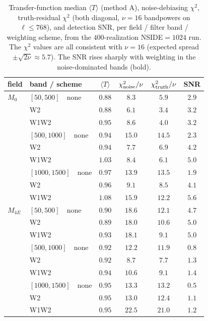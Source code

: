 \documentclass[11pt]{article}
\begin{document}
\begin{table}[h]
\centering
\small
\begin{tabular}{llcccc}
\toprule
field & band / scheme & $\langle T\rangle$ & $\chi^2_{\rm noise}/\nu$ & $\chi^2_{\rm truth}/\nu$ & SNR\\
\midrule
$M_0$  & $[50,500]$\ \ none   & $0.88$ & $8.3$  & $5.9$  & $2.9$\\
       & \hphantom{$[50,500]$\ \ }W2     & $0.88$ & $6.1$  & $3.4$  & $3.2$\\
       & \hphantom{$[50,500]$\ \ }W1W2   & $0.95$ & $8.6$  & $4.0$  & $3.2$\\
       & $[500,1000]$\ \ none & $0.94$ & $15.0$ & $14.5$ & $2.3$\\
       & \hphantom{$[500,1000]$\ \ }W2     & $0.94$ & $7.7$  & $6.9$  & $4.2$\\
       & \hphantom{$[500,1000]$\ \ }W1W2   & $1.03$ & $8.4$  & $6.1$  & $\mathbf{5.0}$\\
       & $[1000,1500]$\ \ none& $0.97$ & $13.9$ & $13.5$ & $1.9$\\
       & \hphantom{$[1000,1500]$\ \ }W2     & $0.96$ & $9.1$  & $8.5$  & $4.1$\\
       & \hphantom{$[1000,1500]$\ \ }W1W2   & $1.08$ & $15.9$ & $12.2$ & $\mathbf{5.6}$\\
\midrule
$M_{4E}$ & $[50,500]$\ \ none   & $0.90$ & $18.6$ & $12.1$ & $4.7$\\
       & \hphantom{$[50,500]$\ \ }W2     & $0.89$ & $18.0$ & $10.6$ & $5.0$\\
       & \hphantom{$[50,500]$\ \ }W1W2   & $0.93$ & $18.1$ & $9.1$  & $5.0$\\
       & $[500,1000]$\ \ none & $0.92$ & $12.2$ & $11.9$ & $0.8$\\
       & \hphantom{$[500,1000]$\ \ }W2     & $0.92$ & $8.7$  & $7.7$  & $1.3$\\
       & \hphantom{$[500,1000]$\ \ }W1W2   & $0.94$ & $10.6$ & $9.1$  & $1.4$\\
       & $[1000,1500]$\ \ none& $0.95$ & $13.3$ & $13.2$ & $0.5$\\
       & \hphantom{$[1000,1500]$\ \ }W2     & $0.95$ & $13.0$ & $12.4$ & $1.1$\\
       & \hphantom{$[1000,1500]$\ \ }W1W2   & $0.95$ & $22.5$ & $21.0$ & $1.2$\\
\bottomrule
\end{tabular}
\caption{Transfer-function median $\langle T\rangle$ (method A), noise-debiasing
$\chi^2$, truth-residual $\chi^2$ (both diagonal, $\nu=16$ bandpowers on
$\ell\le768$), and detection SNR, per field / filter band / weighting scheme,
from the $400$-realization NSIDE$=1024$ run. The $\chi^2$ values are all
consistent with $\nu=16$ (expected spread $\pm\sqrt{2\nu}\approx5.7$). The SNR
rises sharply with weighting in the noise-dominated bands (bold).}
\label{tab:chi2}
\end{table}
\end{document}
